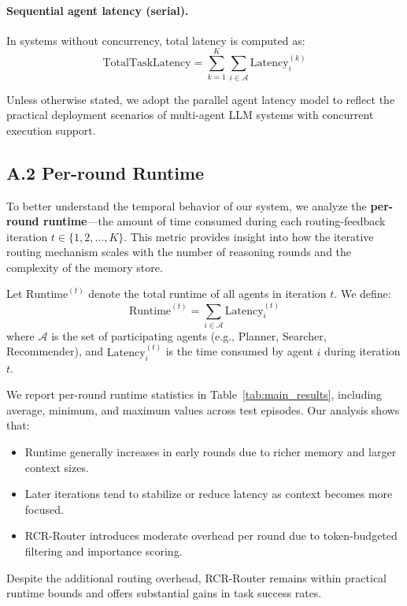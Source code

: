 \paragraph{Sequential agent latency (serial).} In systems without concurrency, total latency is computed as:
\begin{equation}
\text{TotalTaskLatency} = \sum_{k=1}^{K} \sum_{i \in \mathcal{A}} \text{Latency}_{i}^{(k)}
\end{equation}

Unless otherwise stated, we adopt the parallel agent latency model to reflect the practical deployment scenarios of multi-agent LLM systems with concurrent execution support.


\subsection{A.2 \quad Per-round Runtime}

To better understand the temporal behavior of our system, we analyze the \textbf{per-round runtime}---the amount of time consumed during each routing-feedback iteration $t \in \{1, 2, \dots, K\}$. This metric provides insight into how the iterative routing mechanism scales with the number of reasoning rounds and the complexity of the memory store.

Let $\text{Runtime}^{(t)}$ denote the total runtime of all agents in iteration $t$. We define:
\begin{equation}
\text{Runtime}^{(t)} = \sum_{i \in \mathcal{A}} \text{Latency}_{i}^{(t)}
\end{equation}
where $\mathcal{A}$ is the set of participating agents (e.g., Planner, Searcher, Recommender), and $\text{Latency}_{i}^{(t)}$ is the time consumed by agent $i$ during iteration $t$.

We report per-round runtime statistics in Table~\ref{tab:main_results}, including average, minimum, and maximum values across test episodes. Our analysis shows that:
\begin{itemize}
    \item Runtime generally increases in early rounds due to richer memory and larger context sizes.
    \item Later iterations tend to stabilize or reduce latency as context becomes more focused.
    \item RCR-Router introduces moderate overhead per round due to token-budgeted filtering and importance scoring.
\end{itemize}
Despite the additional routing overhead, RCR-Router remains within practical runtime bounds and offers substantial gains in task success rates.

